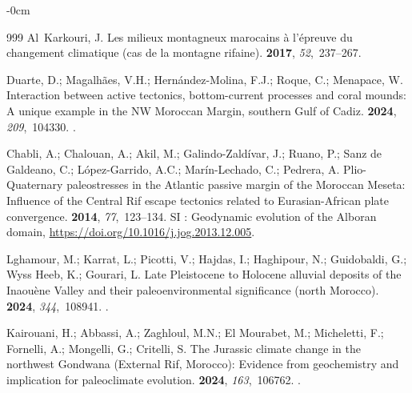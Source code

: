 \documentclass[geomatics,article,accept,pdftex,oneauthor]{Definitions/mdpi}
\begin{document}
\begin{adjustwidth}{-\extralength}{0cm}
\begin{thebibliography}{999}
Al~Karkouri, J.
\newblock Les milieux montagneux marocains {\`a} l’{\'e}preuve du changement
  climatique (cas de la montagne rifaine).
 {\bf 2017}, {\em 52},~237--267.

Duarte, D.; Magalhães, V.H.; Hernández-Molina, F.J.; Roque, C.; Menapace, W.
\newblock Interaction between active tectonics, bottom-current processes and
  coral mounds: A unique example in the NW Moroccan Margin, southern Gulf of
  Cadiz.
 {\bf
  2024}, {\em 209},~104330.
.

Chabli, A.; Chalouan, A.; Akil, M.; Galindo-Zaldívar, J.; Ruano, P.; {Sanz de
  Galdeano}, C.; López-Garrido, A.C.; Marín-Lechado, C.; Pedrera, A.
\newblock Plio-Quaternary paleostresses in the Atlantic passive margin of the
  Moroccan Meseta: Influence of the Central Rif escape tectonics related to
  Eurasian-African plate convergence.
 {\bf 2014}, {\em 77},~123--134.
\newblock SI : Geodynamic evolution of the Alboran domain,
  {\url{https://doi.org/10.1016/j.jog.2013.12.005}}.

Lghamour, M.; Karrat, L.; Picotti, V.; Hajdas, I.; Haghipour, N.; Guidobaldi,
  G.; {Wyss Heeb}, K.; Gourari, L.
\newblock Late Pleistocene to Holocene alluvial deposits of the Inaouène
  Valley and their paleoenvironmental significance (north Morocco).
 {\bf 2024}, {\em 344},~108941.
.

Kairouani, H.; Abbassi, A.; Zaghloul, M.N.; {El Mourabet}, M.; Micheletti, F.;
  Fornelli, A.; Mongelli, G.; Critelli, S.
\newblock The Jurassic climate change in the northwest Gondwana (External Rif,
  Morocco): Evidence from geochemistry and implication for paleoclimate
  evolution.
 {\bf 2024}, {\em 163},~106762.
.


\end{thebibliography}
\end{adjustwidth}
\end{document}
